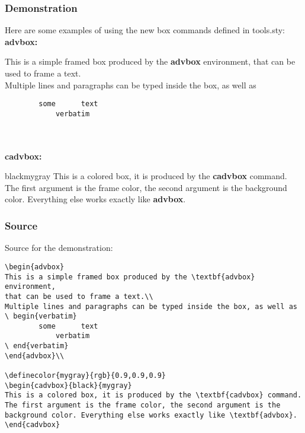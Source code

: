 \subsubsection{Demonstration}
Here are some examples of using the new box commands defined in tools.sty:\\

\noindent
\textbf{advbox:}\\

\begin{advbox}
This is a simple framed box produced by the \textbf{advbox} environment,
that can be used to frame a text.\\
Multiple lines and paragraphs can be typed inside the box, as well as
\begin{Verbatim}
        some      text
            verbatim
\end{Verbatim}
\end{advbox}\\
\\

\noindent
\textbf{cadvbox:}\\

\begin{cadvbox}{black}{mygray}
This is a colored box, it is produced by the \textbf{cadvbox} command.
The first argument is the frame color, the second argument is the
background color. Everything else works exactly like \textbf{advbox}.
\end{cadvbox}


\subsubsection{Source}
Source for the demonstration:

\begin{verbatim}
\begin{advbox}
This is a simple framed box produced by the \textbf{advbox} environment,
that can be used to frame a text.\\
Multiple lines and paragraphs can be typed inside the box, as well as
\ begin{verbatim}
        some      text
            verbatim
\ end{verbatim}
\end{advbox}\\

\definecolor{mygray}{rgb}{0.9,0.9,0.9}
\begin{cadvbox}{black}{mygray}
This is a colored box, it is produced by the \textbf{cadvbox} command.
The first argument is the frame color, the second argument is the
background color. Everything else works exactly like \textbf{advbox}.
\end{cadvbox}
\end{verbatim}
\newpage


